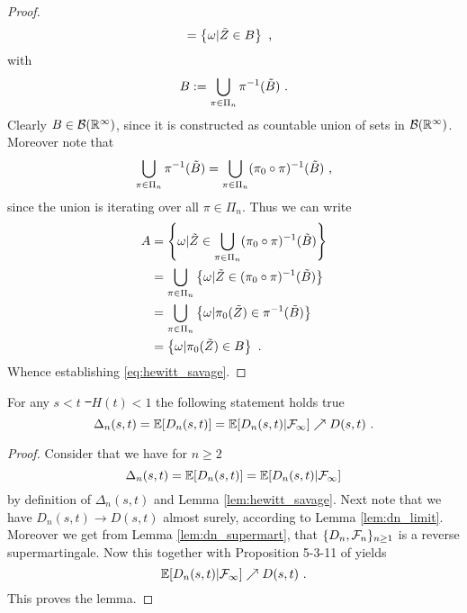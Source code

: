 \begin{lemma}
\begin{proof}
\begin{align*}
			&= \left\{\omega | \tilde{Z} \in B\right\}\textrm{ ,}
		\end{align*}		
		with 
		$$B:=\bigcup\limits_{\pi\in\Pi_n}\pi^{-1}(\tilde{B})\textrm{ .}$$
		Clearly $B\in\mathcal{B}(\mathbb{R}^\infty)$, since it is constructed as countable union of sets in $\mathcal{B}(\mathbb{R}^\infty)$.
		Moreover note that 
		$$\bigcup\limits_{\pi\in\Pi_n}\pi^{-1}(\tilde{B}) = \bigcup\limits_{\pi\in\Pi_n}(\pi_0\circ\pi)^{-1}(\tilde{B})\textrm{ ,}$$
		since the union is iterating over all $\pi\in\Pi_n$. Thus we can write
		\begin{align*}
			A &= \left\{\omega | \tilde{Z} \in \bigcup\limits_{\pi\in\Pi_n}(\pi_0\circ\pi)^{-1}(\tilde{B})\right\}\\
			&= \bigcup\limits_{\pi\in\Pi_n}\left\{\omega | \tilde{Z} \in (\pi_0\circ\pi)^{-1}(\tilde{B})\right\}\\
			&= \bigcup\limits_{\pi\in\Pi_n}\left\{\omega | \pi_0(\tilde{Z}) \in \pi^{-1}(\tilde{B})\right\}\\
			&= \left\{\omega | \pi_0(\tilde{Z}) \in B\right\}\textrm{ .}
		\end{align*}		
	 	Whence establishing \eqref{eq:hewitt_savage}.
	\end{proof}
\end{lemma}
%
\begin{lemma}For any $s<t$ \st\ $H(t)<1$ the following statement holds true
	$$\Delta_{n}(s,t) = \mathbb{E}[D_n(s,t)] = \mathbb{E}[D_n(s,t)|\mathcal{F}_\infty] \nearrow D(s,t)\textrm{ .}$$
	\label{lem:neveu}
	\begin{proof}
		Consider that we have for $n\geq 2$
		$$\Delta_{n}(s,t) = \mathbb{E}[D_n(s,t)] = \mathbb{E}[D_n(s,t)|\mathcal{F}_\infty] $$
		by definition of $\Delta_{n}(s,t)$ and Lemma \ref{lem:hewitt_savage}. Next note that we have $D_n(s,t) \to D(s,t)$ almost surely, according to Lemma \ref{lem:dn_limit}. Moreover we get from Lemma \ref{lem:dn_supermart}, that $\{D_n,\mathcal{F}_n\}_{n\geq 1}$ is a reverse supermartingale. Now this together with Proposition 5-3-11 of \cite{neveu1975discrete} yields
		$$\mathbb{E}[D_n(s,t)|\mathcal{F}_\infty] \nearrow D(s,t)\textrm{ .}$$
		This proves the lemma.
	\end{proof}
\end{lemma}
%
%
%
%

